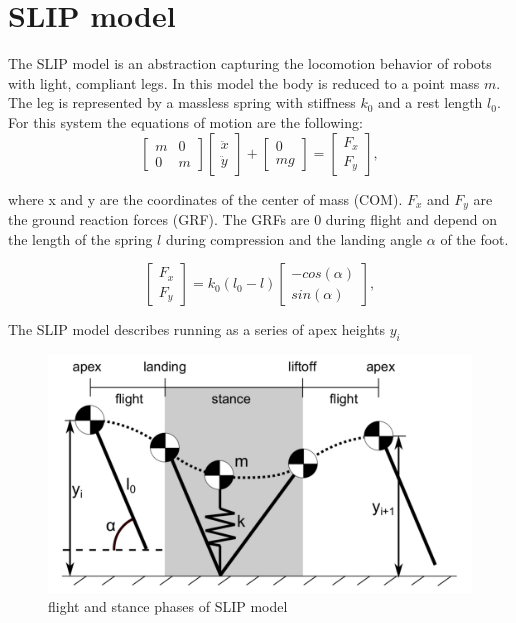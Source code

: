 \documentclass[10pt, conference]{IEEEtran}
\begin{document}
\section{SLIP model}
\label{sec:SLIP model}
The SLIP model is an abstraction capturing the locomotion behavior of robots with light, compliant legs. In this model the body is reduced to a point mass \( m \). The
leg is represented by a massless spring with stiffness \({k}_0 \) and a rest length \({l}_0 \). For this system the equations of motion are the following:
\begin{equation}
   \begin{bmatrix} m & 0 \\ 0 & m \end{bmatrix}
   \begin{bmatrix} \ddot{x} \\ \ddot{y} \end{bmatrix}
   +
   \begin{bmatrix} 0 \\ mg \end{bmatrix}
   =
   \begin{bmatrix} {F}_{x} \\ {F}_{y} \end{bmatrix},
   \label{eq:equation of motion}
\end{equation}

where x and y are the coordinates of the center of mass (COM). \({F}_x \) and \({F}_y \) are the ground reaction forces (GRF). The GRFs are 0 during flight and depend 
on the length of the spring \(l\) during compression and the landing angle \(\alpha\) of the foot.

\begin{equation}
   \begin{bmatrix} {F}_{x}  \\ {F}_{y}  \end{bmatrix}
   =
   {k}_{0} ({l}_{0} -l)
   \begin{bmatrix} -cos(\alpha) \\ sin(\alpha) \end{bmatrix},
\end{equation}

The SLIP model describes running as a series of apex heights \({y}_i \)

\begin{figure}[h]
   \centering
   \includegraphics[scale=0.2]{"assets/SMM2.pdf"}
   \caption{flight and stance phases of SLIP model \cite{Wu2014}}
   \label{fig_SLIP_phase}
\end{figure}
\end{document}
